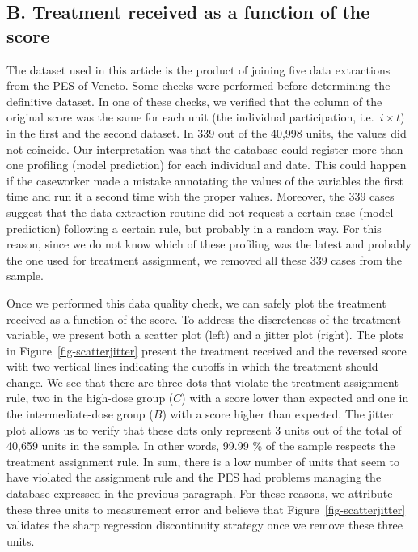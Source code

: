 \documentclass[
  11pt]{article}
\begin{document}
\subsection*{B. Treatment received as a function of the
score}\label{b.-treatment-received-as-a-function-of-the-score}

The dataset used in this article is the product of joining five data
extractions from the PES of Veneto. Some checks were performed before
determining the definitive dataset. In one of these checks, we verified
that the column of the original score was the same for each unit (the
individual participation, i.e.~\(i \times t\)) in the first and the
second dataset. In 339 out of the 40,998 units, the values did not
coincide. Our interpretation was that the database could register more
than one profiling (model prediction) for each individual and date. This
could happen if the caseworker made a mistake annotating the values of
the variables the first time and run it a second time with the proper
values. Moreover, the 339 cases suggest that the data extraction routine
did not request a certain case (model prediction) following a certain
rule, but probably in a random way. For this reason, since we do not
know which of these profiling was the latest and probably the one used
for treatment assignment, we removed all these 339 cases from the
sample.

Once we performed this data quality check, we can safely plot the
treatment received as a function of the score. To address the
discreteness of the treatment variable, we present both a scatter plot
(left) and a jitter plot (right). The plots in
Figure~\ref{fig-scatterjitter} present the treatment received and the
reversed score with two vertical lines indicating the cutoffs in which
the treatment should change. We see that there are three dots that
violate the treatment assignment rule, two in the high-dose group
(\(C\)) with a score lower than expected and one in the
intermediate-dose group (\(B\)) with a score higher than expected. The
jitter plot allows us to verify that these dots only represent 3 units
out of the total of 40,659 units in the sample. In other words, 99.99 \%
of the sample respects the treatment assignment rule. In sum, there is a
low number of units that seem to have violated the assignment rule and
the PES had problems managing the database expressed in the previous
paragraph. For these reasons, we attribute these three units to
measurement error and believe that Figure~\ref{fig-scatterjitter}
validates the sharp regression discontinuity strategy once we remove
these three units.
\end{document}
